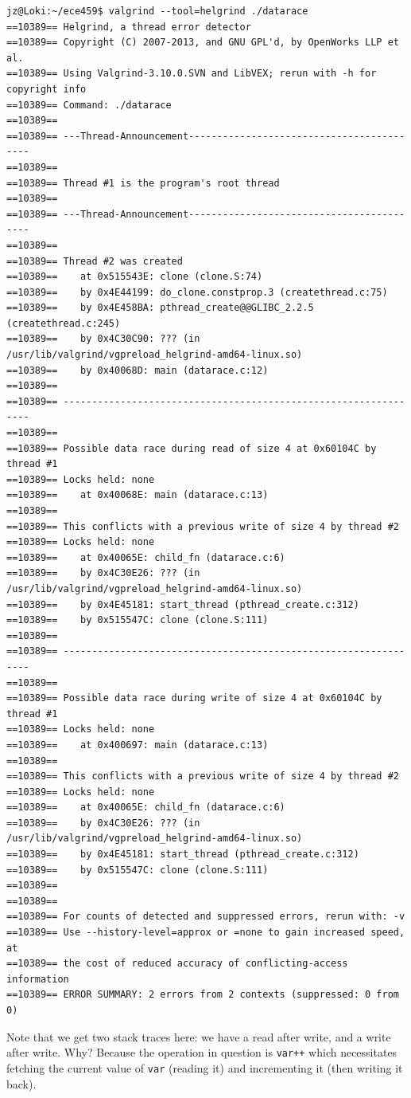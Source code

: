\documentclass[a4paper]{report}
\begin{document}
\begin{lstlisting}
jz@Loki:~/ece459$ valgrind --tool=helgrind ./datarace
==10389== Helgrind, a thread error detector
==10389== Copyright (C) 2007-2013, and GNU GPL'd, by OpenWorks LLP et al.
==10389== Using Valgrind-3.10.0.SVN and LibVEX; rerun with -h for copyright info
==10389== Command: ./datarace
==10389== 
==10389== ---Thread-Announcement------------------------------------------
==10389== 
==10389== Thread #1 is the program's root thread
==10389== 
==10389== ---Thread-Announcement------------------------------------------
==10389== 
==10389== Thread #2 was created
==10389==    at 0x515543E: clone (clone.S:74)
==10389==    by 0x4E44199: do_clone.constprop.3 (createthread.c:75)
==10389==    by 0x4E458BA: pthread_create@@GLIBC_2.2.5 (createthread.c:245)
==10389==    by 0x4C30C90: ??? (in /usr/lib/valgrind/vgpreload_helgrind-amd64-linux.so)
==10389==    by 0x40068D: main (datarace.c:12)
==10389== 
==10389== ----------------------------------------------------------------
==10389== 
==10389== Possible data race during read of size 4 at 0x60104C by thread #1
==10389== Locks held: none
==10389==    at 0x40068E: main (datarace.c:13)
==10389== 
==10389== This conflicts with a previous write of size 4 by thread #2
==10389== Locks held: none
==10389==    at 0x40065E: child_fn (datarace.c:6)
==10389==    by 0x4C30E26: ??? (in /usr/lib/valgrind/vgpreload_helgrind-amd64-linux.so)
==10389==    by 0x4E45181: start_thread (pthread_create.c:312)
==10389==    by 0x515547C: clone (clone.S:111)
==10389== 
==10389== ----------------------------------------------------------------
==10389== 
==10389== Possible data race during write of size 4 at 0x60104C by thread #1
==10389== Locks held: none
==10389==    at 0x400697: main (datarace.c:13)
==10389== 
==10389== This conflicts with a previous write of size 4 by thread #2
==10389== Locks held: none
==10389==    at 0x40065E: child_fn (datarace.c:6)
==10389==    by 0x4C30E26: ??? (in /usr/lib/valgrind/vgpreload_helgrind-amd64-linux.so)
==10389==    by 0x4E45181: start_thread (pthread_create.c:312)
==10389==    by 0x515547C: clone (clone.S:111)
==10389== 
==10389== 
==10389== For counts of detected and suppressed errors, rerun with: -v
==10389== Use --history-level=approx or =none to gain increased speed, at
==10389== the cost of reduced accuracy of conflicting-access information
==10389== ERROR SUMMARY: 2 errors from 2 contexts (suppressed: 0 from 0)
\end{lstlisting}

Note that we get two stack traces here: we have a read after write, and a write after write. Why? Because the operation in question is \texttt{var++} which necessitates fetching the current value of \texttt{var} (reading it) and incrementing it (then writing it back).
\end{document}
